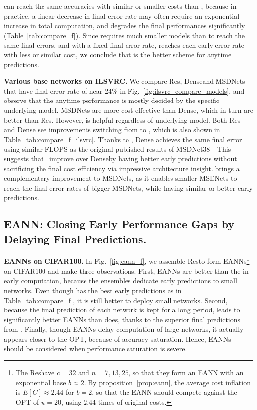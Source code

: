 \adaloss can reach the same accuracies with similar or smaller costs than \const, because in practice, a linear decrease in final error rate may often require an exponential increase in total computation, and \const degrades the final performances significantly (Table~\ref{tab:compare_f}). Since \adaloss requires much smaller models than \const to reach the same final errors, and with a fixed final error rate, \adaloss reaches each early error rate with less or similar cost, we conclude that \adaloss is the better scheme for anytime predictions. 

\textbf{Various base networks on ILSVRC.} We compare Res\anns, Dense\anns and MSDNets that have final error rate of near 24\% in Fig.~\ref{fig:ilsvrc_compare_models}, and observe that the anytime performance is mostly decided by the specific underlying model. MSDNets are more cost-effective than Dense\anns, which in turn are better than Res\anns. 
However, \adaloss is helpful regardless of underlying model. Both Res and Dense see improvements switching from \const to \adaloss, which is also shown in Table~\ref{tab:compare_f_ilsvrc}. 
Thanks to \adaloss, Dense achieves the same final error using similar FLOPS as the original published results of MSDNet38~\cite{msdense}. This suggests that~\cite{msdense} improve over Dense\anns by having better early predictions without sacrificing the final cost efficiency via impressive architecture insight. \adaloss brings a complementary improvement to MSDNets, as it enables smaller MSDNets to reach the final error rates of bigger MSDNets, while having similar or better early predictions. 




\subsection{EANN: Closing Early Performance Gaps by Delaying Final Predictions.}
\label{sec:eann_experiment}



\textbf{EANNs on CIFAR100.} In Fig.~\ref{fig:eann_f}, we assemble Res\anns to form EANNs\footnote{The Res\anns have $c=32$ and $n=7, 13, 25$, so that they form an EANN with an exponential base $b\approx 2$. 
By proposition~\ref{prop:eann}, the average cost inflation is $E[C]\approx 2.44$ for $b=2$, so that the EANN should 
compete against the OPT of $n=20$, using $2.44$ times of original costs.} on CIFAR100 and make three observations.
First, EANNs are better than the \ann in early computation, because the ensembles dedicate early predictions to small networks. Even though \const has the best early predictions as in Table~\ref{tab:compare_f}, it is still better to deploy small networks. 
Second, because the final prediction of each network is kept for a long period, \adaloss leads to significantly better EANNs than \const does, thanks to the superior final predictions from \adaloss. 
Finally, though EANNs delay computation of large networks, it actually appears closer to the OPT, because of accuracy saturation. Hence, EANNs should be considered when performance saturation is severe. 

